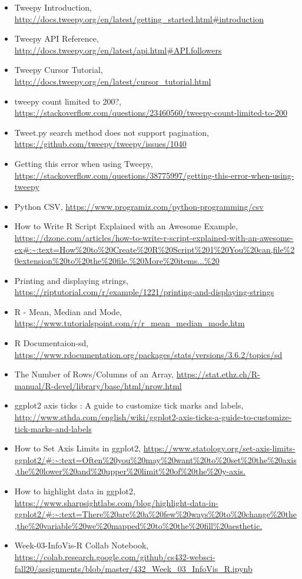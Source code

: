 \documentclass[12pt]{article}
\begin{document}
\begin{itemize}
    \item{Tweepy Introduction, \url{http://docs.tweepy.org/en/latest/getting_started.html#introduction}}
    \item{Tweepy API Reference, \url{http://docs.tweepy.org/en/latest/api.html#API.followers}}
    \item{Tweepy Cursor Tutorial, \url{http://docs.tweepy.org/en/latest/cursor_tutorial.html}}
    \item{tweepy count limited to 200?, \url{https://stackoverflow.com/questions/23460560/tweepy-count-limited-to-200}}
    \item{Tweet.py search method does not support pagination, \url{https://github.com/tweepy/tweepy/issues/1040}}
    \item{Getting this error when using Tweepy, \url{https://stackoverflow.com/questions/38775997/getting-this-error-when-using-tweepy}}
    \item{Python CSV, \url{https://www.programiz.com/python-programming/csv}}
    \item{How to Write R Script Explained with an Awesome Example, \url{https://dzone.com/articles/how-to-write-r-script-explained-with-an-awesome-ex#:~:text=How\%20to\%20Create\%20R\%20Script\%201\%20You\%20can,file\%20extension\%20to\%20the\%20file.\%20More\%20items...\%20}}
    \item{Printing and displaying strings, \url{https://riptutorial.com/r/example/1221/printing-and-displaying-strings}}
    \item{R - Mean, Median and Mode, \url{https://www.tutorialspoint.com/r/r_mean_median_mode.htm}}
    \item{R Documentaion-sd, \url{https://www.rdocumentation.org/packages/stats/versions/3.6.2/topics/sd}}
    \item{The Number of Rows/Columns of an Array, \url{https://stat.ethz.ch/R-manual/R-devel/library/base/html/nrow.html}}
    \item{ggplot2 axis ticks : A guide to customize tick marks and labels, \url{http://www.sthda.com/english/wiki/ggplot2-axis-ticks-a-guide-to-customize-tick-marks-and-labels}}
    \item{How to Set Axis Limits in ggplot2, \url{https://www.statology.org/set-axis-limits-ggplot2/#:~:text=Often\%20you\%20may\%20want\%20to\%20set\%20the\%20axis,the\%20lower\%20and\%20upper\%20limit\%20of\%20the\%20y-axis.}}
    \item{How to highlight data in ggplot2, \url{https://www.sharpsightlabs.com/blog/highlight-data-in-ggplot2/#:~:text=There\%20are\%20a\%20few\%20ways\%20to\%20change\%20the,the\%20variable\%20we\%20mapped\%20to\%20the\%20fill\%20aesthetic.}}
    \item{Week-03-InfoVis-R Collab Notebook, \url{https://colab.research.google.com/github/cs432-websci-fall20/assignments/blob/master/432_Week_03_InfoVis_R.ipynb}}
    
    \end{itemize}
\end{document}
